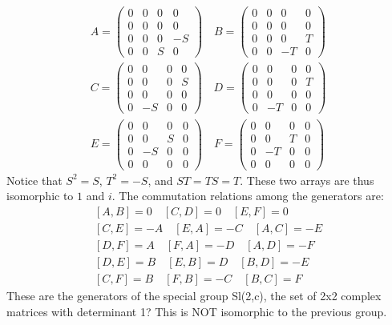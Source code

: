 \documentclass[12pt]{article}
\begin{document}
\begin{eqnarray*}
A = \left( \begin{array}{cccc}
0 & 0 & 0 & 0 \\
0 & 0 & 0 & 0 \\
0 & 0 & 0 & -S \\
0 & 0 & S & 0
\end{array} \right) \quad
B = \left( \begin{array}{cccc}
0 & 0 & 0 & 0 \\
0 & 0 & 0 & 0 \\
0 & 0 & 0 & T \\
0 & 0 & -T & 0
\end{array} \right) \\		%
C = \left( \begin{array}{cccc}
0 & 0 & 0 & 0 \\
0 & 0 & 0 & S \\
0 & 0 & 0 & 0 \\
0 & -S & 0 & 0 
\end{array} \right) \quad
D = \left( \begin{array}{cccc}
0 & 0 & 0 & 0 \\
0 & 0 & 0 & T \\
0 & 0 & 0 & 0 \\
0 & -T & 0 & 0
\end{array} \right) \\
E = \left( \begin{array}{cccc}
0 & 0 & 0 & 0 \\
0 & 0 & S & 0 \\
0 & -S & 0 & 0 \\
0 & 0 & 0 & 0  
\end{array} \right) \quad
F = \left( \begin{array}{cccc}
0 & 0 & 0 & 0 \\
0 & 0 & T & 0 \\
0 & -T & 0 & 0 \\
0 & 0 & 0 & 0  
\end{array} \right)
\end{eqnarray*}
Notice that $S^2 = S$, $T^2=-S$, and $ST = TS = T$.  These two arrays are
thus isomorphic to $1$ and $i$.  The commutation relations among the
generators are:
\begin{eqnarray*}
\left[ A,B \right] =  0 \quad\left[ C,D \right] = 0 \quad\left[ E,F \right] = 0\\
\left[ C,E \right] = -A \quad\left[ E,A \right] = -C \quad\left[ A,C \right] = -E\\
\left[ D,F \right] =  A \quad\left[ F,A \right] = -D \quad\left[ A,D \right] = -F\\
\left[ D,E \right] =  B \quad\left[ E,B \right] =  D \quad\left[ B,D \right] = -E\\
\left[ C,F \right] =  B \quad\left[ F,B \right] = -C \quad\left[ B,C \right] =  F
\end{eqnarray*}
These are the generators of the special group Sl(2,c), the set of 2x2 complex
matrices with determinant 1?
This is NOT isomorphic to the previous group.
\end{document}
